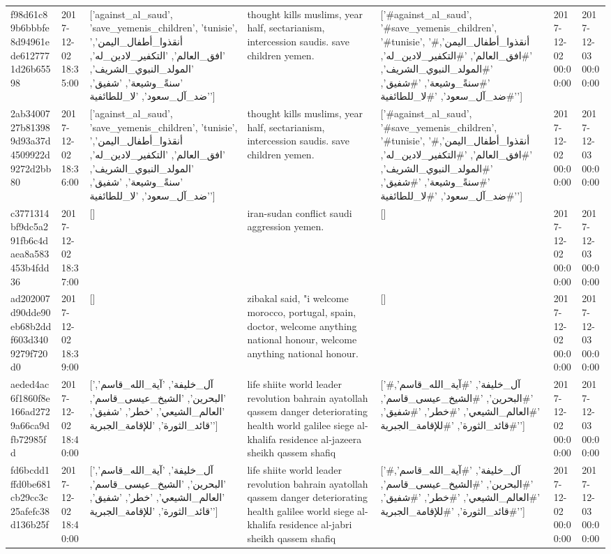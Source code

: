 \begin{tabular}{lllllll}
f98d61c89b6bbbfe8d94961ede6127771d26b65598 & 2017-12-02 18:35:00 & ['against_al_saud', 'save_yemenis_children', 'tunisie', 'أنقذوا_أطفال_اليمن', 'افق_العالم', 'التكفير_لادين_له', 'المولد_النبوي_الشريف', 'سنةً_وشيعة', 'شفيق', 'ضد_آل_سعود', 'لا_للطائفية'] & thought kills muslims, year half, sectarianism, intercession saudis. save children yemen. & ['#against_al_saud', '#save_yemenis_children', '#tunisie', '#أنقذوا_أطفال_اليمن', '#افق_العالم', '#التكفير_لادين_له', '#المولد_النبوي_الشريف', '#سنةً_وشيعة', '#شفيق', '#ضد_آل_سعود', '#لا_للطائفية'] & 2017-12-02 00:00:00 & 2017-12-03 00:00:00 \\
2ab3400727b813989d93a37d4509922d9272d2bb80 & 2017-12-02 18:36:00 & ['against_al_saud', 'save_yemenis_children', 'tunisie', 'أنقذوا_أطفال_اليمن', 'افق_العالم', 'التكفير_لادين_له', 'المولد_النبوي_الشريف', 'سنةً_وشيعة', 'شفيق', 'ضد_آل_سعود', 'لا_للطائفية'] & thought kills muslims, year half, sectarianism, intercession saudis. save children yemen. & ['#against_al_saud', '#save_yemenis_children', '#tunisie', '#أنقذوا_أطفال_اليمن', '#افق_العالم', '#التكفير_لادين_له', '#المولد_النبوي_الشريف', '#سنةً_وشيعة', '#شفيق', '#ضد_آل_سعود', '#لا_للطائفية'] & 2017-12-02 00:00:00 & 2017-12-03 00:00:00 \\
c3771314bf9dc5a291fb6c4daea8a583453b4fdd36 & 2017-12-02 18:37:00 & [] & iran-sudan conflict saudi aggression yemen. & [] & 2017-12-02 00:00:00 & 2017-12-03 00:00:00 \\
ad202007d90dde90eb68b2ddf603d3409279f720d0 & 2017-12-02 18:39:00 & [] & zibakal said, "i welcome morocco, portugal, spain, doctor, welcome anything national honour, welcome anything national honour. & [] & 2017-12-02 00:00:00 & 2017-12-03 00:00:00 \\
aeded4ac6f1860f8e166ad2729a66ca9dfb72985fd & 2017-12-02 18:40:00 & ['آل_خليفة', 'آية_الله_قاسم', 'البحرين', 'الشيخ_عيسى_قاسم', 'العالم_الشيعي', 'خطر', 'شفيق', 'قائد_الثورة', 'للإقامة_الجبرية'] & life shiite world leader revolution bahrain ayatollah qassem danger deteriorating health world galilee siege al-khalifa residence al-jazeera sheikh qassem shafiq & ['#آل_خليفة', '#آية_الله_قاسم', '#البحرين', '#الشيخ_عيسى_قاسم', '#العالم_الشيعي', '#خطر', '#شفيق', '#قائد_الثورة', '#للإقامة_الجبرية'] & 2017-12-02 00:00:00 & 2017-12-03 00:00:00 \\
fd6bcdd1ffd0be681cb29cc3c25afefc38d136b25f & 2017-12-02 18:40:00 & ['آل_خليفة', 'آية_الله_قاسم', 'البحرين', 'الشيخ_عيسى_قاسم', 'العالم_الشيعي', 'خطر', 'شفيق', 'قائد_الثورة', 'للإقامة_الجبرية'] & life shiite world leader revolution bahrain ayatollah qassem danger deteriorating health galilee world siege al-khalifa residence al-jabri sheikh qassem shafiq & ['#آل_خليفة', '#آية_الله_قاسم', '#البحرين', '#الشيخ_عيسى_قاسم', '#العالم_الشيعي', '#خطر', '#شفيق', '#قائد_الثورة', '#للإقامة_الجبرية'] & 2017-12-02 00:00:00 & 2017-12-03 00:00:00 \\

\end{tabular}
